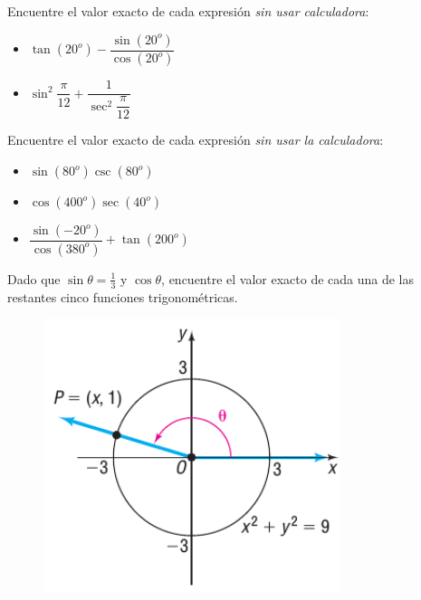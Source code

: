 {}
	\begin{problema}
		\label{exmp:6304}
		Encuentre el valor exacto de cada expresión \emph{sin usar calculadora}:
		\begin{itemize}
			\item $\tan(20^{o})-\dfrac{\sin(20^{o})}{\cos(20^{o})}$ 
			\item $\sin^{2}\dfrac{\pi}{12}+\dfrac{1}{\sec^{2}\dfrac{\pi}{12}}$
		\end{itemize}
		
	\end{problema}
	

{}
	\begin{problema}
		Encuentre el valor exacto de cada expresión \emph{sin usar la calculadora}:
		\begin{itemize}
			\item $\sin(80^{o})\csc(80^{o})$
			\item $\cos(400^{o})\sec(40^{o})$
			\item $\dfrac{\sin(-20^{o})}{\cos(380^{o})}+\tan(200^{o})$
		\end{itemize}
		
	\end{problema}
	


	\begin{problema}
		\label{exmp:sull6305}
		Dado que $\sin\theta=\frac{1}{3}$ y $\cos\theta$, encuentre el valor exacto de cada una de las restantes cinco funciones trigonométricas.
	\end{problema}
	

{}
	\begin{figure}[h]
		\centering
		\includegraphics[height=8cm]{./trig/sull0641.png}
		\label{fig:0641}
	\end{figure}
	

